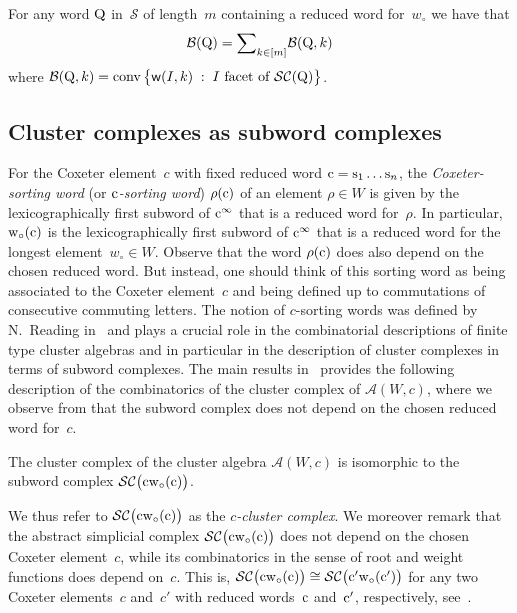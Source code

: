 \documentclass[ALCO,Unicode,ThmDefs]{cedram}
\DeclareMathOperator{\conv}{conv}
\newcommand{\Dfn}[1]{\emph{#1}}
\newcommand{\Alg}{\mathcal{A}}
\newcommand{\subwordComplex}{\mathcal{SC}}
\newcommand{\clusterComplex}{\subwordComplex\big(\cw{c}\big)}
\newcommand{\sq}[1]{{\rm #1}}
\newcommand{\Q}{\sq{Q}}
\newcommand{\s}{\sq{s}}
\newcommand{\sref}{\mathcal{S}}
\newcommand{\sfw}{\mathsf{w}}
\newcommand{\wo}{{w_\circ}}
\renewcommand{\c}{\sq{c}}
\newcommand{\sw}[2]{\sq{#1}(\sq{#2})}
\newcommand{\cwo}[1]{\sw{\wo}{#1}}
\newcommand{\cw}[1]{\sq{#1}\cwo{#1}}
\newcommand{\brickPolytope}{\mathcal{B}}
\newcommand{\Weight}[2]{{\sfw}(#1,#2)}
\newcommand{\bigset}[2]{\big\{ #1 \;:\; #2 \big\}}
\newcommand{\Mink}{{\sum}}
\begin{document}
\begin{theo}[{\cite[Proposition~1.5]{PS2015}}]\label{thm:minkowski}
For any word $\Q$ in~$\sref$ of length~$m$ containing a reduced word for~$\wo$ we have that
\[
\brickPolytope(\Q) = \Mink_{k \in [m]} \brickPolytope(\Q,k)
\]
where $\brickPolytope(\Q,k) = \conv \bigset{\Weight{I}{k}}{I \text{ facet of } \subwordComplex(\Q)}$.
\end{theo}

\subsection{Cluster complexes as subword complexes}\label{sec:clustercomplexes}

For the Coxeter element~$c$ with fixed reduced word $\c = \s_1\dots\s_n$, the \Dfn{Coxeter-sorting word} (or \Dfn{$\c$-sorting word}) $\rho(\c)$ of an element $\rho \in W$ is given by the lexicographically first subword of $\c^\infty$ that is a reduced word for~$\rho$. In particular, $\cwo{c}$ is the lexicographically first subword of $\c^\infty$ that is a reduced word for the longest element~$\wo \in W$. Observe that the word $\rho(\c)$ does also depend on the chosen reduced word. But instead, one should think of this sorting word as being associated to the Coxeter element~$c$ and being defined up to commutations of consecutive commuting letters. The notion of $c$-sorting words was defined by N.~Reading in~\cite{R2007} and plays a crucial role in the combinatorial descriptions of finite type cluster algebras and in particular in the description of cluster complexes in terms of subword complexes. The main results in~\cite{CLS2014} provides the following description of the combinatorics of the cluster complex of $\Alg(W,c)$, where we observe from  that the subword complex does not depend on the chosen reduced word for~$c$.

\begin{theo}\label{thm:cluster1}
The cluster complex of the cluster algebra $\Alg(W,c)$ is isomorphic to the subword complex $\clusterComplex$.
\end{theo}

We thus refer to $\clusterComplex$ as the \Dfn{$c$-cluster complex}. We moreover remark that the abstract simplicial complex $\clusterComplex$ does not depend on the chosen Coxeter element~$c$, while its combinatorics in the sense of root and weight functions does depend on~$c$. This is, $\subwordComplex\big(\cw{c}\big) \cong \subwordComplex\big(\cw{c'}\big)$ for any two Coxeter elements~$c$ and~$c'$ with reduced words~$\c$ and~$\c'$, respectively, see~\cite[Theorem~2.6]{CLS2014}.
\end{document}

